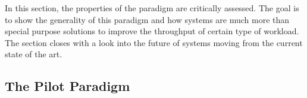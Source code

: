 \documentclass{sig-alternate}
\begin{document}
In this section, the properties of the \pilot paradigm are critically assessed.
The goal is to show the generality of this paradigm and how \pilot systems
are much more than special purpose solutions to
improve the throughput of certain type of workload. The section closes with a
look into the future of \pilot systems moving from the current state of the art.






\subsection{The Pilot Paradigm}
\label{sec:paradigm}
\end{document}
